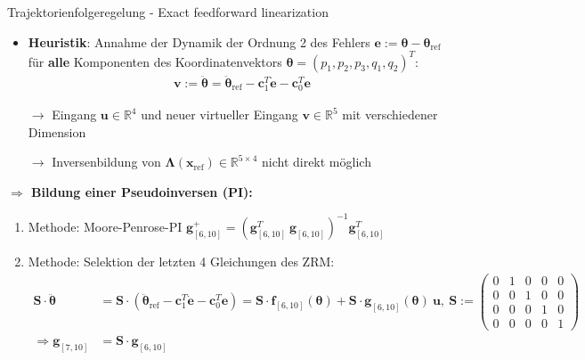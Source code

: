 \documentclass[
	ngerman,
	10pt,				%
	aspectratio=169 	%
]{beamer}
\begin{document}
\begin{frame}[t,fragile,label=trajektorienregelung_10]{\large Trajektorienfolgeregelung - Exact feedforward linearization}
	
	\begin{itemize}
		\item \textbf{Heuristik}: Annahme der Dynamik der Ordnung 2 des Fehlers $\mathbf{e} := \boldsymbol{\theta} - \boldsymbol{\theta}_{\text{ref}}$ für \textbf{alle} Komponenten des Koordinatenvektors $\boldsymbol{\theta} = (p_1, p_2, p_3, q_1, q_2)^T$:
		\begin{align*}
			\mathbf{v} := \ddot{\boldsymbol{\theta}} = \ddot{\boldsymbol{\theta}}_{\text{ref}} - \mathbf{c}_1^T \dot{\mathbf{e}} - \mathbf{c}_0^T \mathbf{e}
		\end{align*}
		\pause
		\item[$\rightarrow$] Eingang $\mathbf{u} \in \mathbb{R}^{4}$ und neuer virtueller Eingang $\mathbf{v} \in \mathbb{R}^{5}$ mit verschiedener Dimension
		\item[$\rightarrow$] Inversenbildung von $\boldsymbol{\Lambda}(\mathbf{x}_{\text{ref}}) \in \mathbb{R}^{5 \times 4}$ nicht direkt möglich \\
	\end{itemize}
	\bigskip
	\pause
	\textbf{$\Rightarrow$ Bildung einer Pseudoinversen (PI):}
	\begin{enumerate}
		\item Methode: Moore-Penrose-PI \quad $\mathbf{g}_{[6, 10]}^+ =  (\mathbf{g}_{[6, 10]}^T \	\mathbf{g}_{[6, 10]})^{-1} 	\mathbf{g}_{[6, 10]}^T$
		\pause
		\item Methode: Selektion der letzten 4 Gleichungen des ZRM:
		\begin{align*}
			\mathbf{S} \cdot \ddot{\boldsymbol{\theta}} &= \mathbf{S} \cdot (\ddot{\boldsymbol{\theta}}_{\text{ref}} - \mathbf{c}_1^T \dot{\mathbf{e}} - \mathbf{c}_0^T \mathbf{e}) = \mathbf{S} \cdot \mathbf{f}_{[6, 10]}(\boldsymbol{\theta}) + \mathbf{S} \cdot \mathbf{g}_{[6, 10]}(\boldsymbol{\theta}) \ \mathbf{u}, \	
			\mathbf{S} := 
			\left(\begin{smallmatrix}
				0 & 1 & 0 & 0 & 0 \\
				0 & 0 & 1 & 0 & 0 \\
				0 & 0 & 0 & 1 & 0 \\
				0 & 0 & 0 & 0 & 1
			\end{smallmatrix}\right) \\
			\Rightarrow \mathbf{g}_{[7, 10]} &= \mathbf{S} \cdot \mathbf{g}_{[6, 10]}
		\end{align*}
	\end{enumerate}
	
\end{frame}
\end{document}
